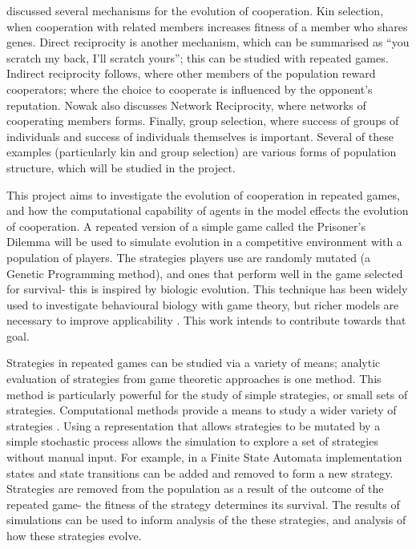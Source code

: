 \documentclass[a4paper,11pt,bcshonoursthesis,singlespace,twoside]{cssethesis}
\begin{document}
\citet{nowak:Science:2006} discussed several mechanisms for the evolution of cooperation. 
Kin selection, when cooperation with related members increases fitness of a member who shares genes. 
Direct reciprocity is another mechanism, which can be summarised as ``you scratch my back, I'll scratch yours''; this can be studied with repeated games. 
Indirect reciprocity follows, where other members of the population reward cooperators; where the choice to cooperate is influenced by the opponent's reputation. 
Nowak also discusses Network Reciprocity, where networks of cooperating members forms. 
Finally, group selection, where success of groups of individuals and success of individuals themselves is important. 
Several of these examples (particularly kin and group selection) are various forms of population structure, which will be studied in the project. 

This project aims to investigate the evolution of cooperation in repeated games, and how the computational capability of agents in the model effects the evolution of cooperation. 
A repeated version of a simple game called the Prisoner's Dilemma will be used to simulate evolution in a competitive environment with a population of players. 
The strategies players use are randomly mutated (a Genetic Programming method), and ones that perform well in the game selected for survival- this is inspired by biologic evolution. 
This technique has been widely used to investigate behavioural biology with game theory, but richer models are necessary to improve applicability \citep{McNamara2013}. 
This work intends to contribute towards that goal. 

Strategies in repeated games can be studied via a variety of means; analytic evaluation of strategies from game theoretic approaches is one method. 
This method is particularly powerful for the study of simple strategies, or small sets of strategies. 
Computational methods provide a means to study a wider variety of strategies \citep{fogel1993evolving}. 
Using a representation that allows strategies to be mutated by a simple stochastic process allows the simulation to explore a set of strategies without manual input. 
For example, in a Finite State Automata implementation states and state transitions can be added and removed to form a new strategy. 
Strategies are removed from the population as a result of the outcome of the repeated game- the fitness of the strategy determines its survival. 
The results of simulations can be used to inform analysis of the these strategies, and analysis of how these strategies evolve.
\end{document}
